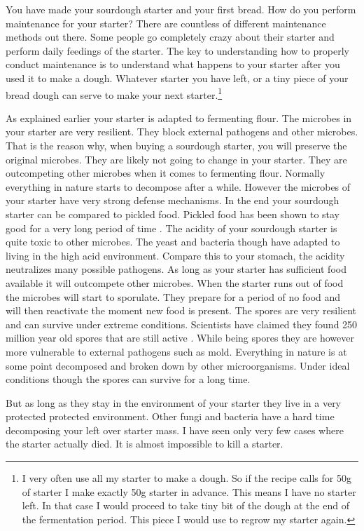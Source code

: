You have made your sourdough starter and your first bread. How do you perform
maintenance for your starter? There are countless of different maintenance
methods out there. Some people go completely crazy about their starter and
perform daily feedings of the starter. The key to understanding how to properly
conduct maintenance is to understand what happens to your starter after you
used it to make a dough. Whatever starter you have left, or a tiny piece of
your bread dough can serve to make your next starter.\footnote{I very often use all my
starter to make a dough. So if the recipe calls for 50g of starter I make
exactly 50g starter in advance. This means I have no starter left. In that
case I would proceed to take tiny bit of the dough at the end of the
fermentation period. This piece I would use to regrow my starter again.}


As explained earlier your starter is adapted
to fermenting flour. The microbes in your starter are very resilient. They
block external pathogens and other microbes. That is the reason why, when
buying a sourdough starter, you will preserve the original microbes. They are
likely not going to change in your starter. They are outcompeting other
microbes when it comes to fermenting flour. Normally everything in nature
starts to decompose after a while. However the microbes of your starter have
very strong defense mechanisms. In the end your sourdough starter can be
compared to pickled food. Pickled food has been shown to stay good for a very
long period of time \cite{pickled+foods+expiration}. The acidity of your sourdough starter is quite
toxic to other microbes. The yeast and bacteria though have adapted to living
in the high acid environment. Compare this to your stomach, the acidity
neutralizes many possible pathogens. As long as your starter has sufficient
food available it will outcompete other microbes. When the starter runs out of
food the microbes will start to sporulate. They prepare for a period of no
food and will then reactivate the moment new food is present. The
spores are very resilient and can survive under extreme conditions.
Scientists have claimed they found 250 million year old spores that are still 
active \cite{old+spores}. While being spores
they are however more vulnerable to external pathogens such as mold.
Everything in nature is at some point decomposed and broken down by other
microorganisms. Under ideal conditions though the spores can survive for a
long time.

But as long as they stay in the environment of your starter they live
in a very protected protected environment. Other fungi and bacteria have a hard time decomposing your left over starter mass.
I have seen only very few cases where the starter actually died. It is almost impossible
to kill a starter.

